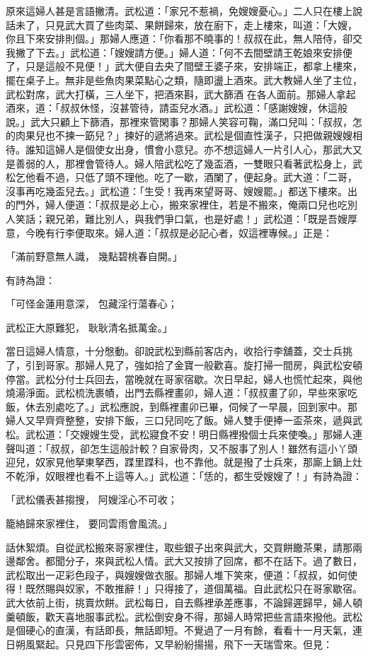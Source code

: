 原來這婦人甚是言語撇清。武松道：「家兄不惹禍，免嫂嫂憂心。」二人只在樓上說話未了，只見武大買了些肉菜、果餅歸來，放在廚下，走上樓來，叫道：「大嫂，你且下來安排則個。」那婦人應道：「你看那不曉事的！叔叔在此，無人陪侍，卻交我撇了下去。」武松道：「嫂嫂請方便。」婦人道：「何不去間壁請王乾娘來安排便了，只是這般不見便！」武大便自去央了間壁王婆子來，安排端正，都拿上樓來，擺在桌子上。無非是些魚肉果菜點心之類，隨即盪上酒來。武大教婦人坐了主位，武松對席，武大打橫，三人坐下，把酒來斟，武大篩酒 在各人面前。那婦人拿起酒來，道：「叔叔休怪，沒甚管待，請盃兒水酒。」武松道：「感謝嫂嫂，休這般說。」武大只顧上下篩酒，那裡來管閑事？那婦人笑容可鞠，滿口兒叫：「叔叔，怎的肉果兒也不揀一筯兒？」揀好的遞將過來。武松是個直性漢子，只把做親嫂嫂相待。誰知這婦人是個使女出身，慣會小意兒。亦不想這婦人一片引人心，那武大又是善弱的人，那裡會管待人。婦人陪武松吃了幾盃酒，一雙眼只看著武松身上，武松乞他看不過，只低了頭不理他。吃了一歇，酒闌了，便起身。武大道：「二哥，沒事再吃幾盃兒去。」武松道：「生受！我再來望哥哥、嫂嫂罷。」都送下樓來。出的門外，婦人便道：「叔叔是必上心，搬來家裡住，若是不搬來，俺兩口兒也吃別人笑話；親兄弟，難比別人，與我們爭口氣，也是好處！」武松道：「既是吾嫂厚意，今晚有行李便取來。婦人道：「叔叔是必記心者，奴這裡專候。」正是：

「滿前野意無人識，  幾點碧桃春自開。」

有詩為證：

「可怪金蓮用意深，  包藏淫行蕩春心；

武松正大原難犯，  耿耿清名抵萬金。」

當日這婦人情意，十分慇動。卻說武松到縣前客店內，收拾行李舖蓋，交士兵挑了，引到哥家。那婦人見了，強如拾了金寶一般歡喜。旋打掃一間房，與武松安頓停當。武松分付士兵回去，當晚就在哥家宿歇。次日早起，婦人也慌忙起來，與他燒湯淨面。武松梳洗裹幘，出門去縣裡畫卯，婦人道：「叔叔畫了卯，早些來家吃飯，休去別處吃了。」武松應說，到縣裡畫卯已畢，伺候了一早晨，回到家中。那婦人又早齊齊整整，安排下飯，三口兒同吃了飯。婦人雙手便捧一盃茶來，遞與武松。武松道：「交嫂嫂生受，武松寢食不安！明日縣裡撥個士兵來使喚。」那婦人連聲叫道：「叔叔，卻怎生這般計較？自家骨肉，又不服事了別人！雖然有這小丫頭迎兒，奴家見他拏東拏西，蹀里蹀科，也不靠他。就是撥了士兵來，那廝上鍋上灶不乾淨，奴眼裡也看不上這等人。」武松道：「恁的，都生受嫂嫂了！」有詩為證：

「武松儀表甚搊搜，  阿嫂淫心不可收；

籠絡歸來家裡住，  要同雲雨會風流。」

話休絮煩。自從武松搬來哥家裡住，取些銀子出來與武大，交買餅饊茶果，請那兩邊鄰舍。都聞分子，來與武松人情。武大又按排了回席，都不在話下。過了數日，武松取出一疋彩色段子，與嫂嫂做衣服。那婦人堆下笑來，便道：「叔叔，如何使得！既然賜與奴家，不敢推辭！」只得接了，道個萬福。自此武松只在哥家歇宿。武大依前上街，挑賣炊餅。武松每日，自去縣裡承差應事，不論歸遲歸早，婦人頓羹頓飯，歡天喜地服事武松。武松倒安身不得，那婦人時常把些言語來撥他。武松是個硬心的直漢，有話即長，無話即短。不覺過了一月有餘，看看十一月天氣，連日朔風緊起。只見四下彤雲密佈，又早紛紛揚揚，飛下一天瑞雪來。但見：

